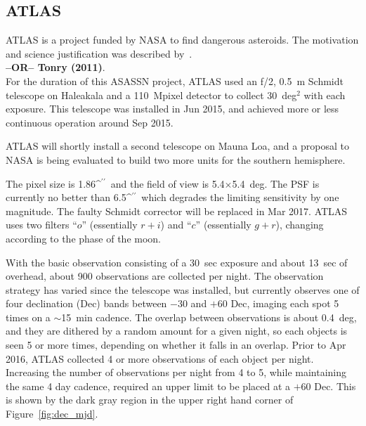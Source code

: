 \documentclass[aps,prb,twocolumn,superscriptaddress]{revtex4-1}
\def\arcsec{\ifmmode^{\prime\prime}\else$^{\prime\prime}$\fi}
\begin{document}
\subsection{ATLAS}
%
ATLAS is a project funded by NASA to find dangerous asteroids.  The
motivation and science justification was described by~\cite{ATLAS_data}.  \\
{\bf --OR--  Tonry (2011)}.  \\
For the duration of this ASASSN project, ATLAS used an f/2, 0.5~m
Schmidt telescope on Haleakala and a 110~Mpixel detector to collect
30~deg$^2$ with each exposure.  This telescope was installed in Jun
2015, and achieved more or less continuous operation around Sep 2015.

ATLAS will shortly install a second telescope on Mauna Loa, and a
proposal to NASA is being evaluated to build two more units for the
southern hemisphere.

The pixel size is 1.86\arcsec\ and the field of view is
5.4$\times$5.4~deg.  The PSF is currently no better than 6.5\arcsec\
which degrades the limiting sensitivity by one magnitude.  The faulty
Schmidt corrector will be replaced in Mar 2017.  ATLAS uses two
filters ``$o$'' (essentially $r+i$) and ``$c$'' (essentially $g+r$),
changing according to the phase of the moon.

With the basic observation consisting of a 30~sec exposure and about 
13~sec of overhead, about 900 observations are collected per night.  
The observation strategy has varied since the telescope was
installed, but currently observes one of four declination (Dec) bands between $-30$ %
and $+60$ Dec, imaging each spot 5 times on a $\sim$15~min cadence.
The overlap between observations is about 0.4~deg, and they are
dithered by a random amount for a given night, so each objects is seen
5 or more times, depending on whether it falls in an overlap.  
Prior to Apr 2016, ATLAS collected 4 or more observations of each object 
per night. Increasing the number of observations per night from 4 to 5, 
while maintaining the same 4 day cadence, required an upper limit to 
be placed at a $+60$ Dec. This is shown by the dark gray region in 
the upper right hand corner of Figure~\ref{fig:dec_mjd}.
\end{document}
